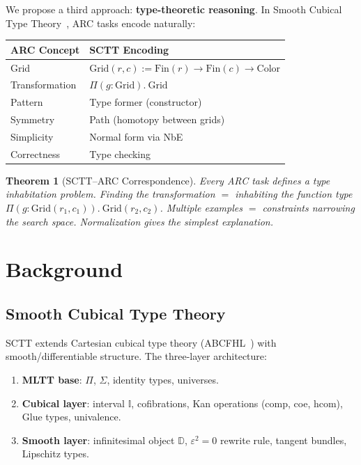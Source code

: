 \documentclass[11pt,a4paper]{article}
\newtheorem{theorem}{Theorem}[section]
\newcommand{\Grid}{\mathrm{Grid}}
\newcommand{\Color}{\mathrm{Color}}
\newcommand{\Fin}{\mathrm{Fin}}
\begin{document}
We propose a third approach: \textbf{type-theoretic reasoning}.  In
Smooth Cubical Type Theory~\cite{Scott2026}, ARC tasks encode
naturally:

\begin{center}
\begin{tabular}{@{}ll@{}}
\toprule
\textbf{ARC Concept} & \textbf{SCTT Encoding} \\
\midrule
Grid & $\Grid(r,c) := \Fin(r) \to \Fin(c) \to \Color$ \\
Transformation & $\Pi(g:\Grid).\ \Grid$ \\
Pattern & Type former (constructor) \\
Symmetry & Path (homotopy between grids) \\
Simplicity & Normal form via NbE \\
Correctness & Type checking \\
\bottomrule
\end{tabular}
\end{center}

\begin{theorem}[SCTT--ARC Correspondence]
Every ARC task defines a type inhabitation problem.  Finding the
transformation $= $ inhabiting the function type
$\Pi(g:\Grid(r_1,c_1)).\ \Grid(r_2,c_2)$.  Multiple examples $=$
constraints narrowing the search space.  Normalization gives the
simplest explanation.
\end{theorem}

\section{Background}
\label{sec:background}

\subsection{Smooth Cubical Type Theory}

SCTT extends Cartesian cubical type theory
(ABCFHL~\cite{ABCFHL2021}) with smooth/differentiable structure.  The
three-layer architecture:
\begin{enumerate}[nosep]
  \item \textbf{MLTT base}: $\Pi$, $\Sigma$, identity types, universes.
  \item \textbf{Cubical layer}: interval $\mathbb{I}$, cofibrations,
    Kan operations (comp, coe, hcom), Glue types, univalence.
  \item \textbf{Smooth layer}: infinitesimal object $\mathbb{D}$,
    $\varepsilon^2 = 0$ rewrite rule, tangent bundles, Lipschitz types.
\end{enumerate}
\end{document}
